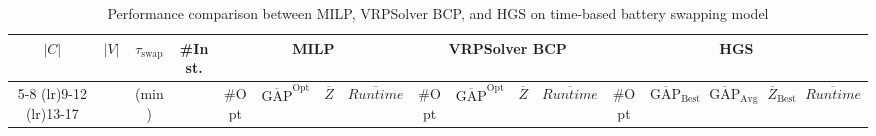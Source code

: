 \documentclass[3p, authoryear, 11pt]{elsarticle}
\begin{document}
\begin{table}[H]
    \centering
    \setlength{\tabcolsep}{3pt}
    \renewcommand{\arraystretch}{0.95} 
    \caption{Performance comparison between MILP, VRPSolver BCP, and HGS on time-based battery swapping model}
    \label{tab:performance_milp_cp_hgs_time_based}
    \scriptsize
    \setlength{\tabcolsep}{2pt}
    \begin{tabular}{cccc cccc cccc ccccc}
    \toprule
    \multirow{2}{*}{$|C|$} & 
    \multirow{2}{*}{$|V|$} & 
    \multirow{2}{*}{$\tau_{\mathrm{swap}}$} & 
    \multirow{2}{*}{\#Inst.} &
    \multicolumn{4}{c}{MILP} & 
    \multicolumn{4}{c}{VRPSolver BCP} & 
    \multicolumn{5}{c}{HGS} \\
    \cmidrule(lr){5-8} \cmidrule(lr){9-12} \cmidrule(lr){13-17}
    & & (min) & 
    & \#Opt 
    & $\overline{\mathrm{GAP}}^{\mathrm{Opt}}$ 
    & $\overline{Z}$ 
    & $\overline{Runtime}$ 
    & \#Opt 
    & $\overline{\mathrm{GAP}}^{\mathrm{Opt}}$ 
    & $\overline{Z}$ 
    & $\overline{Runtime}$ 
    & \#Opt 
    & $\overline{\mathrm{GAP}}_{\text{Best}}$ 
    & $\overline{\mathrm{GAP}}_{\text{Avg}}$ 
    & $\overline{Z}_{\text{Best}}$ 
    & $\overline{Runtime}$ \\
    \midrule
    


\end{tabular}
\end{table}
\end{document}
